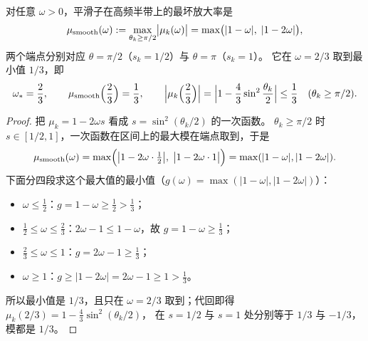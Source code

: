 \begin{theorem}[最优平滑权重与平滑因子]
\label{thm:mg-smooth}
对任意 $\omega>0$，平滑子在高频半带上的最坏放大率是
\begin{equation}
  \mu_{\rm smooth}(\omega):=\max_{\theta_k\ge\pi/2}\bigl|\mu_k(\omega)\bigr|
  =\max\bigl(|1-\omega|,\;|1-2\omega|\bigr),
  \label{eq:mg-smoothmax}
\end{equation}
两个端点分别对应 $\theta=\pi/2$（$s_k=1/2$）与 $\theta=\pi$（$s_k=1$）。
它在 $\omega=2/3$ 取到最小值 $1/3$，即
\begin{equation}
  \omega_\ast=\frac23,\qquad
  \mu_{\rm smooth}\Bigl(\frac23\Bigr)=\frac13,
  \qquad
  \Bigl|\mu_k\Bigl(\frac23\Bigr)\Bigr|=\Bigl|1-\frac43\sin^2\frac{\theta_k}{2}\Bigr|\le\frac13
  \quad(\theta_k\ge\pi/2).
  \label{eq:mg-smoothing-factor}
\end{equation}
\end{theorem}

\begin{proof}
把 $\mu_k=1-2\omega s$ 看成 $s=\sin^2(\theta_k/2)$ 的一次函数。
$\theta_k\ge\pi/2$ 时 $s\in[1/2,1]$，一次函数在区间上的最大模在端点取到，于是
\begin{equation}
  \mu_{\rm smooth}(\omega)=\max\Bigl(\bigl|1-2\omega\cdot\tfrac12\bigr|,\;
  \bigl|1-2\omega\cdot1\bigr|\Bigr)=\max(|1-\omega|,|1-2\omega|).
\end{equation}
下面分四段求这个最大值的最小值（$g(\omega)=\max(|1-\omega|,|1-2\omega|)$）：
\begin{itemize}
  \item $\omega\le\frac12$：$g=1-\omega\ge\frac12>\frac13$；
  \item $\frac12\le\omega\le\frac23$：$2\omega-1\le1-\omega$，故 $g=1-\omega\ge\frac13$；
  \item $\frac23\le\omega\le1$：$g=2\omega-1\ge\frac13$；
  \item $\omega\ge1$：$g\ge|1-2\omega|=2\omega-1\ge1>\frac13$。
\end{itemize}
所以最小值是 $1/3$，且只在 $\omega=2/3$ 取到；代回即得
$\mu_k(2/3)=1-\frac43\sin^2(\theta_k/2)$，
在 $s=1/2$ 与 $s=1$ 处分别等于 $1/3$ 与 $-1/3$，模都是 $1/3$。
\end{proof}

